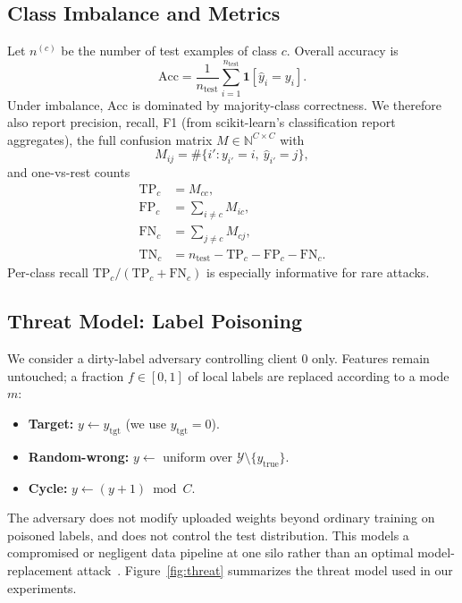 \documentclass[journal]{IEEEtran}
\begin{document}
\subsection{Class Imbalance and Metrics}
Let $n^{(c)}$ be the number of test examples of class $c$. Overall accuracy is
\begin{equation}
\mathrm{Acc}=\frac{1}{n_{\mathrm{test}}}\sum_{i=1}^{n_{\mathrm{test}}}\mathbf{1}[\hat{y}_i=y_i].
\end{equation}
Under imbalance, $\mathrm{Acc}$ is dominated by majority-class correctness. We therefore also report precision, recall, F1 (from scikit-learn's classification report aggregates), the full confusion matrix $M\in\mathbb{N}^{C\times C}$ with
\begin{equation}
M_{ij}=\#\{i': y_{i'}=i,\ \hat{y}_{i'}=j\},
\end{equation}
and one-vs-rest counts
\begin{align}
\mathrm{TP}_c&=M_{cc},\\
\mathrm{FP}_c&=\sum_{i\neq c}M_{ic},\\
\mathrm{FN}_c&=\sum_{j\neq c}M_{cj},\\
\mathrm{TN}_c&=n_{\mathrm{test}}-\mathrm{TP}_c-\mathrm{FP}_c-\mathrm{FN}_c.
\end{align}
Per-class recall $\mathrm{TP}_c/(\mathrm{TP}_c+\mathrm{FN}_c)$ is especially informative for rare attacks.

\subsection{Threat Model: Label Poisoning}
\label{sec:threat}
We consider a dirty-label adversary controlling client $0$ only. Features remain untouched; a fraction $f\in[0,1]$ of local labels are replaced according to a mode $m$:
\begin{itemize}
\item \textbf{Target:} $y\leftarrow y_{\mathrm{tgt}}$ (we use $y_{\mathrm{tgt}}=0$).
\item \textbf{Random-wrong:} $y\leftarrow$ uniform over $\mathcal{Y}\setminus\{y_{\mathrm{true}}\}$.
\item \textbf{Cycle:} $y\leftarrow (y+1)\bmod C$.
\end{itemize}
The adversary does not modify uploaded weights beyond ordinary training on poisoned labels, and does not control the test distribution. This models a compromised or negligent data pipeline at one silo rather than an optimal model-replacement attack~\cite{bagdasaryan2020backdoor}. Figure~\ref{fig:threat} summarizes the threat model used in our experiments.
\end{document}
